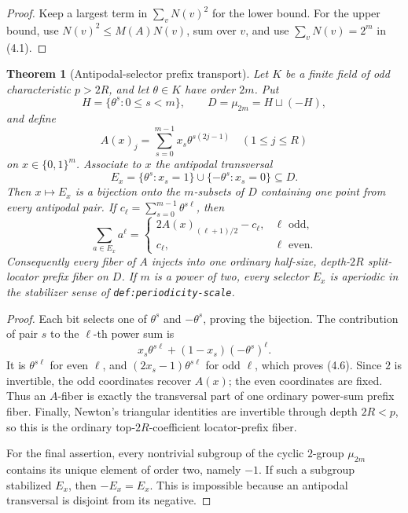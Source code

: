 \documentclass[11pt,a4paper]{amsart}
\newtheorem{theorem}{Theorem}[section]
\theoremstyle{remark}
\begin{document}
\begin{proof}
Keep a largest term in \(\sum_vN(v)^2\) for the lower bound.  For the upper
bound, use \(N(v)^2\le M(A)N(v)\), sum over $v$, and use
\(\sum_vN(v)=2^m\) in (4.1).
\end{proof}

\begin{theorem}[Antipodal-selector prefix transport]
\label{thm:selector-transport}
Let \(K\) be a finite field of odd characteristic \(p>2R\), and let
\(\theta\in K\) have order \(2m\).  Put
\[
 H=\{\theta^s:0\le s<m\},\qquad D=\mu_{2m}=H\sqcup(-H),
\]
and define
\[
 A(x)_j=\sum_{s=0}^{m-1}x_s\theta^{s(2j-1)}
 \quad(1\le j\le R)
\]
on \(x\in\{0,1\}^m\).  Associate to \(x\) the antipodal transversal
\[
 E_x=\{\theta^s:x_s=1\}\cup\{-\theta^s:x_s=0\}\subseteq D.
\]
Then \(x\mapsto E_x\) is a bijection onto the \(m\)-subsets of \(D\)
containing one point from every antipodal pair.  If
\(c_\ell=\sum_{s=0}^{m-1}\theta^{s\ell}\), then
\[
 \sum_{a\in E_x}a^\ell=
 \begin{cases}
  2A(x)_{(\ell+1)/2}-c_\ell,&\ell\text{ odd},\\
  c_\ell,&\ell\text{ even}.
 \end{cases}                                        \tag{4.6}
\]
Consequently every fiber of \(A\) injects into one ordinary half-size,
depth-\(2R\) split-locator prefix fiber on \(D\).
If \(m\) is a power of two, every selector \(E_x\) is aperiodic in the
stabilizer sense of \texttt{def:periodicity-scale}.
\end{theorem}

\begin{proof}
Each bit selects one of \(\theta^s\) and \(-\theta^s\), proving the
bijection.  The contribution of pair \(s\) to the \(\ell\)-th power sum is
\[
 x_s\theta^{s\ell}+(1-x_s)(-\theta^s)^\ell.
\]
It is \(\theta^{s\ell}\) for even \(\ell\), and
\((2x_s-1)\theta^{s\ell}\) for odd \(\ell\), which proves (4.6).
Since \(2\) is invertible, the odd coordinates recover \(A(x)\); the even
coordinates are fixed.  Thus an \(A\)-fiber is exactly the transversal
part of one ordinary power-sum prefix fiber.  Finally, Newton's triangular
identities are invertible through depth \(2R<p\), so this is the ordinary
top-\(2R\)-coefficient locator-prefix fiber.

For the final assertion, every nontrivial subgroup of the cyclic
\(2\)-group \(\mu_{2m}\) contains its unique element of order two, namely
\(-1\).  If such a subgroup stabilized \(E_x\), then \(-E_x=E_x\).
This is impossible because an antipodal transversal is disjoint from its
negative.
\end{proof}
\end{document}
